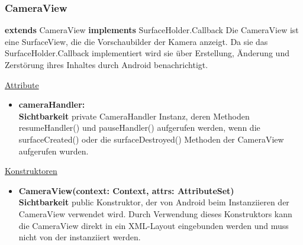 \subsubsection{CameraView} \label{app:klasse:CameraView}
\textbf{extends} CameraView\newline
\textbf{implements} SurfaceHolder.Callback\newline
Die CameraView ist eine SurfaceView, die die Vorschaubilder der Kamera anzeigt. Da sie das SurfaceHolder.Callback implementiert wird sie über Erstellung, Änderung und Zerstörung ihres Inhaltes durch Android benachrichtigt.
\newline

\underline{Attribute}
\begin{itemize}
\itemsep0pt
\item \textbf{cameraHandler: } \hfill\\ 
\textbf{Sichtbarkeit} private \newline
CameraHandler Instanz, deren Methoden resumeHandler() und pauseHandler() aufgerufen werden, wenn die surfaceCreated() oder die surfaceDestroyed() Methoden der CameraView aufgerufen wurden.

\end{itemize}

\underline{Konstruktoren}
\begin{itemize}
\itemsep0pt
\item \textbf{CameraView(context: Context, attrs: AttributeSet)} \hfill\\
\textbf{Sichtbarkeit} public\newline
Konstruktor, der von Android beim Instanziieren der CameraView verwendet wird. Durch Verwendung dieses Konstruktors kann die CameraView direkt in ein XML-Layout eingebunden werden und muss nicht von der  instanziiert werden. 
\end{itemize}

